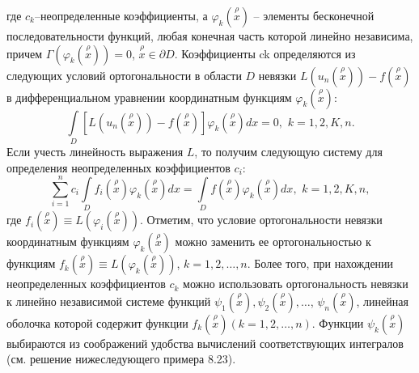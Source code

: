 	\newpage
	\noindent
	где $c_k$–неопределенные коэффициенты, а $\varphi_k(\overset{\rho}{x})$ – элементы бесконечной последовательности функций, любая конечная часть которой линейно независима, причем $\Gamma(\varphi_k(\overset{\rho}{x}))=0$, $\overset{\rho}{x}\in \partial D$. Коэффициенты ck определяются из следующих условий ортогональности в области $D$ невязки $L(u_n(\overset{\rho}{x}))-f(\overset{\rho}{x})$ в дифференциальном уравнении координатным функциям $\varphi_k(\overset{\rho}{x})$:
	$$\textstyle \int\limits_D [L(u_n(\overset{\rho}{x}))-f(\overset{\rho}{x})]\varphi_k(\overset{\rho}{x})dx=0,\,\,k=1,2,K,n.$$
	Если учесть линейность выражения $L$, то получим следующую систему для определения неопределенных коэффициентов $c_i$:
	$$\textstyle \sum\limits^n_{i=1}c_i\int\limits_D f_i(\overset{\rho}{x})\varphi_k (\overset{\rho}{x})dx = \int\limits_D f(\overset{\rho}{x})\varphi_k (\overset{\rho}{x})dx,\,\,k=1,2,K,n,$$
	где $f_i(\overset{\rho}{x})\equiv L(\varphi_i(\overset{\rho}{x}))$. Отметим, что условие ортогональности невязки координатным функциям $\varphi_k(\overset{\rho}{x})$ можно заменить ее ортогональностью к функциям $f_k(\overset{\rho}{x})\equiv L(\varphi_k(\overset{\rho}{x}))$, $k=1, 2, \dots , n$. Более того, при нахождении неопределенных коэффициентов $c_k$ можно использовать ортогональность невязки к линейно независимой системе функций $\psi_1(\overset{\rho}{x}), \psi_2(\overset{\rho}{x}), \dots $,
$\psi_n(\overset{\rho}{x})$, линейная оболочка которой содержит функции $f_k(\overset{\rho}{x}) (k=1, 2, \dots , n)$. Функции $\psi_k(\overset{\rho}{x})$ выбираются из соображений удобства вычислений соответствующих интегралов (см. решение нижеследующего примера 8.23).



